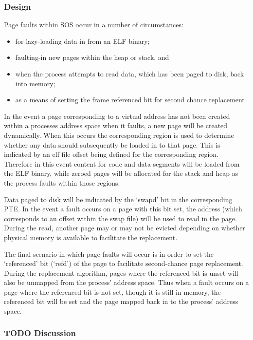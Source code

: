 \documentclass[a4paper,12pt]{article}
\begin{document}
\subsubsection{Design}
Page faults within SOS occur in a number of circumstances:

\begin{itemize}
\item for lazy-loading data in from an ELF binary;
\item faulting-in new pages within the heap or stack, and
\item when the process attempts to read data, which has been paged to disk, back into memory;
\item as a means of setting the frame referenced bit for second chance replacement
\end{itemize}

In the event a page corresponding to a virtual address has not been created
within a processes address space when it faults, a new page will be created
dynamically.  When this occurs the corresponding region is used to determine
whether any data should subsequently be loaded in to that page.  This is
indicated by an elf file offset being defined for the corresponding region.
Therefore in this event content for code and data segments will be loaded from
the ELF binary, while zeroed pages will be allocated for the stack and heap as
the process faults within those regions.

Data paged to disk will be indicated by the `swapd' bit in the corresponding
PTE.  In the event a fault occurs on a page with this bit set, the address
(which corresponds to an offset within the swap file) will be used to read in
the page.  During the read, another page may or may not be evicted depending
on whether physical memory is available to facilitate the replacement.

The final scenario in which page faults will occur is in order to set the
`referenced' bit (`refd') of the page to facilitate second-chance page
replacement.  During the replacement algorithm, pages where the referenced bit
is unset will also be unmapped from the process' address space.  Thus when a
fault occurs on a page where the referenced bit is not set, though it is still
in memory, the referenced bit will be set and the page mapped back in to the
process' address space.

\subsubsection{TODO Discussion}
\end{document}
